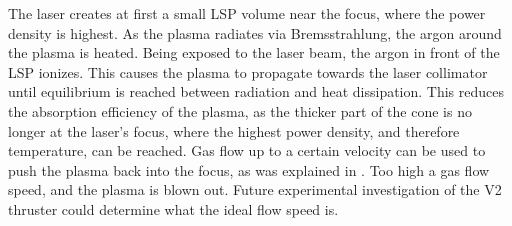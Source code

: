     The laser creates at first a small LSP volume near the focus, where the power density is highest. As the plasma radiates via Bremsstrahlung, the argon around the plasma is heated. Being exposed to the laser beam, the argon in front of the LSP ionizes. This causes the plasma to propagate towards the laser collimator until equilibrium is reached between radiation and heat dissipation. This reduces the absorption efficiency of the plasma, as the thicker part of the cone is no longer at the laser's focus, where the highest power density, and therefore temperature, can be reached. Gas flow up to a certain velocity can be used to push the plasma back into the focus, as was explained in \textcite{chenEmissionSpectroscopyCw1989a}. Too high a gas flow speed, and the plasma is blown out. Future experimental investigation of the V2 thruster could determine what the ideal flow speed is.



    